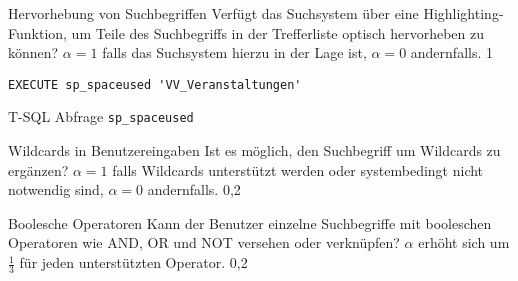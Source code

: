 \myTestDefinition
{Hervorhebung von Suchbegriffen}
{
Verfügt das Suchsystem über eine Highlighting-Funktion, um Teile des Suchbegriffs in der Trefferliste optisch hervorheben zu können?
}
{
$\alpha = 1$ falls das Suchsystem hierzu in der Lage ist, $\alpha = 0$ andernfalls.
}
{1}

\begin{listing}[ht!]
\begin{margincap}
\begin{verbatim}
EXECUTE sp_spaceused 'VV_Veranstaltungen'
\end{verbatim}
\caption{T-SQL Abfrage \texttt{sp\_spaceused}}
\label{lst:tsql_storage}
\end{margincap}
\end{listing}

\myTestDefinition
{Wildcards in Benutzereingaben}
{
Ist es möglich, den Suchbegriff um Wildcards zu ergänzen?
}
{
$\alpha = 1$ falls Wildcards unterstützt werden oder systembedingt nicht notwendig sind, $\alpha = 0$ andernfalls.
}
{0,2}

\myTestDefinition
{Boolesche Operatoren}
{
Kann der Benutzer einzelne Suchbegriffe mit booleschen Operatoren wie AND, OR und NOT versehen oder verknüpfen?
}
{
$\alpha$ erhöht sich um $\frac{1}{3}$ für jeden unterstützten Operator.
}
{0,2}


